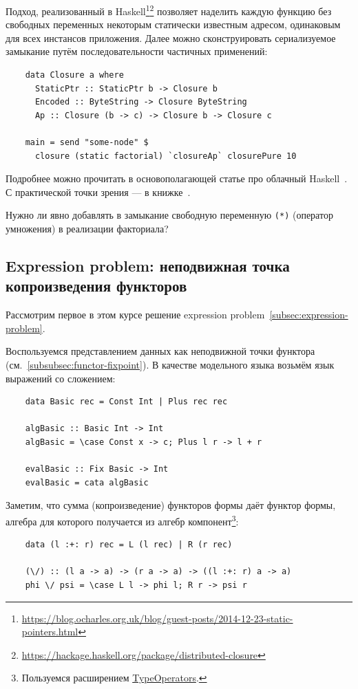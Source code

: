 Подход, реализованный в Haskell\footnote{\url{https://blog.ocharles.org.uk/blog/guest-posts/2014-12-23-static-pointers.html}}\footnote{\url{https://hackage.haskell.org/package/distributed-closure}} позволяет наделить каждую функцию без свободных переменных некоторым статически известным адресом, одинаковым для всех инстансов приложения.
Далее можно сконструировать сериализуемое замыкание путём последовательности частичных применений:
\begin{verbatim}
    data Closure a where
      StaticPtr :: StaticPtr b -> Closure b
      Encoded :: ByteString -> Closure ByteString
      Ap :: Closure (b -> c) -> Closure b -> Closure c

    main = send "some-node" $
      closure (static factorial) `closureAp` closurePure 10
\end{verbatim}

Подробнее можно прочитать в основополагающей статье про облачный Haskell~\cite{epstein2011towards}.
С практической точки зрения --- в книжке~\cite[глава 16]{marlow2011parallel}.

\begin{task}
    Нужно ли явно добавлять в замыкание свободную переменную \texttt{(*)} (оператор умножения) в реализации факториала?
\end{task}

\subsection{Expression problem: неподвижная точка копроизведения функторов} \label{subsec:functor-coprod}

Рассмотрим первое в этом курсе решение expression problem~\ref{subsec:expression-problem}.

Воспользуемся представлением данных как неподвижной точки функтора (см.~\ref{subsubsec:functor-fixpoint}).
В качестве модельного языка возьмём язык выражений со сложением:
\begin{verbatim}
    data Basic rec = Const Int | Plus rec rec

    algBasic :: Basic Int -> Int
    algBasic = \case Const x -> c; Plus l r -> l + r

    evalBasic :: Fix Basic -> Int
    evalBasic = cata algBasic
\end{verbatim}

Заметим, что сумма (копроизведение) функторов формы даёт функтор формы, алгебра для которого получается из алгебр компонент\footnote{Пользуемся расширением \href{https://ghc.gitlab.haskell.org/ghc/doc/users_guide/exts/type_operators.html}{TypeOperators}.}:
\begin{verbatim}
    data (l :+: r) rec = L (l rec) | R (r rec)

    (\/) :: (l a -> a) -> (r a -> a) -> ((l :+: r) a -> a)
    phi \/ psi = \case L l -> phi l; R r -> psi r
\end{verbatim}

